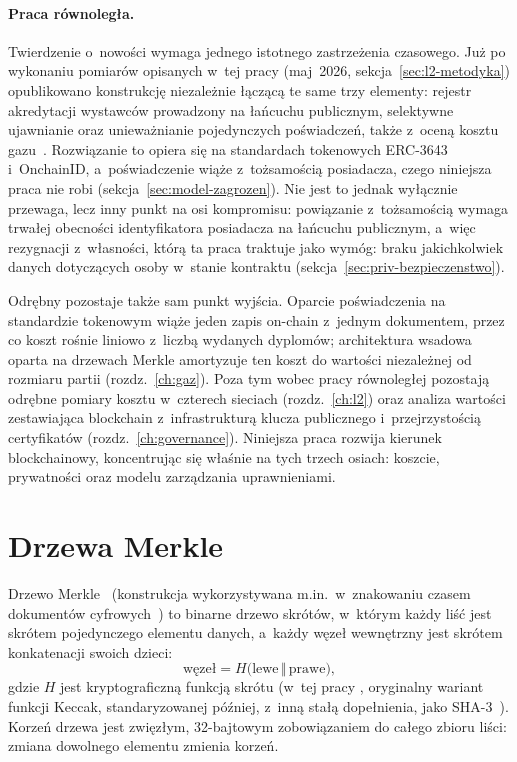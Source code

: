 \paragraph{Praca równoległa.} Twierdzenie o~nowości wymaga jednego istotnego
zastrzeżenia czasowego. Już po wykonaniu pomiarów opisanych w~tej pracy
(maj~2026, sekcja~\ref{sec:l2-metodyka}) opublikowano konstrukcję niezależnie
łączącą te same trzy elementy: rejestr akredytacji wystawców prowadzony na
łańcuchu publicznym, selektywne ujawnianie oraz unieważnianie pojedynczych
poświadczeń, także z~oceną kosztu gazu~\cite{frutuoso2026}. Rozwiązanie to
opiera się na standardach tokenowych ERC-3643 i~OnchainID, a~poświadczenie wiąże
z~tożsamością posiadacza, czego niniejsza praca nie robi
(sekcja~\ref{sec:model-zagrozen}). Nie jest to jednak wyłącznie przewaga, lecz
inny punkt na osi kompromisu: powiązanie z~tożsamością wymaga trwałej obecności
identyfikatora posiadacza na łańcuchu publicznym, a~więc rezygnacji z~własności,
którą ta praca traktuje jako wymóg: braku jakichkolwiek danych dotyczących
osoby w~stanie kontraktu (sekcja~\ref{sec:priv-bezpieczenstwo}).

Odrębny pozostaje także sam punkt wyjścia. Oparcie poświadczenia na standardzie
tokenowym wiąże jeden zapis on-chain z~jednym dokumentem, przez co koszt rośnie
liniowo z~liczbą wydanych dyplomów; architektura wsadowa oparta na drzewach
Merkle amortyzuje ten koszt do wartości niezależnej od rozmiaru partii
(rozdz.~\ref{ch:gaz}). Poza tym wobec pracy równoległej pozostają odrębne
pomiary kosztu w~czterech sieciach (rozdz.~\ref{ch:l2}) oraz analiza wartości
zestawiająca blockchain z~infrastrukturą klucza publicznego i~przejrzystością
certyfikatów (rozdz.~\ref{ch:governance}). Niniejsza praca rozwija kierunek
blockchainowy, koncentrując się właśnie na tych trzech osiach: koszcie,
prywatności oraz modelu zarządzania uprawnieniami.

\section{Drzewa Merkle}
\label{sec:merkle}

Drzewo Merkle~\cite{merkle1987} (konstrukcja wykorzystywana m.in.\
w~znakowaniu czasem dokumentów cyfrowych~\cite{haber1991,bayer1993}) to binarne drzewo
skrótów, w~którym każdy liść jest
skrótem pojedynczego elementu danych, a~każdy węzeł wewnętrzny jest skrótem
konkatenacji swoich dzieci:
\[
  \text{węzeł} = H\bigl(\text{lewe} \,\Vert\, \text{prawe}\bigr),
\]
gdzie $H$ jest kryptograficzną funkcją skrótu (w~tej pracy ,
oryginalny wariant funkcji Keccak, standaryzowanej później, z~inną stałą
dopełnienia, jako SHA-3~\cite{fips202}). Korzeń drzewa jest zwięzłym, 32-bajtowym
zobowiązaniem do całego zbioru liści: zmiana dowolnego elementu zmienia korzeń.

